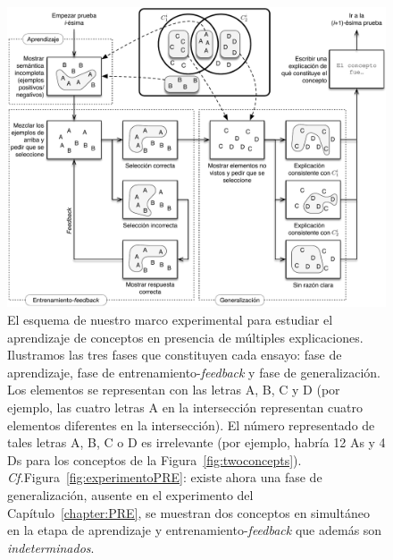\begin{figure}[h!]
\begin{center}
	\includegraphics[scale=.7]{../figuras/brm/experimentscheme2_sp.pdf}
\end{center}\caption{
El esquema de nuestro marco experimental para estudiar el aprendizaje de conceptos en presencia de múltiples explicaciones. Ilustramos las tres fases que constituyen cada ensayo: fase de aprendizaje, fase de entrenamiento-{\em feedback} y fase de generalización. Los elementos se representan con las letras {\sf A}, {\sf B}, {\sf C} y {\sf D} (por ejemplo, las cuatro letras {\sf A} en la intersección representan cuatro elementos diferentes en la intersección). El número representado de tales letras {\sf A}, {\sf B}, {\sf C} o {\sf D} es irrelevante (por ejemplo, habría 12 {\sf A}s y 4 {\sf D}s para los conceptos de la Figura~\ref{fig:twoconcepts}).
{\em Cf.}Figura~\ref{fig:experimentoPRE}: existe ahora una fase de generalización, ausente en el experimento del Capítulo~\ref{chapter:PRE}, se muestran dos conceptos en simultáneo en la etapa de aprendizaje y entrenamiento-{\em feedback} que además son {\em indeterminados}.}
\label{fig:trials}
\end{figure}

